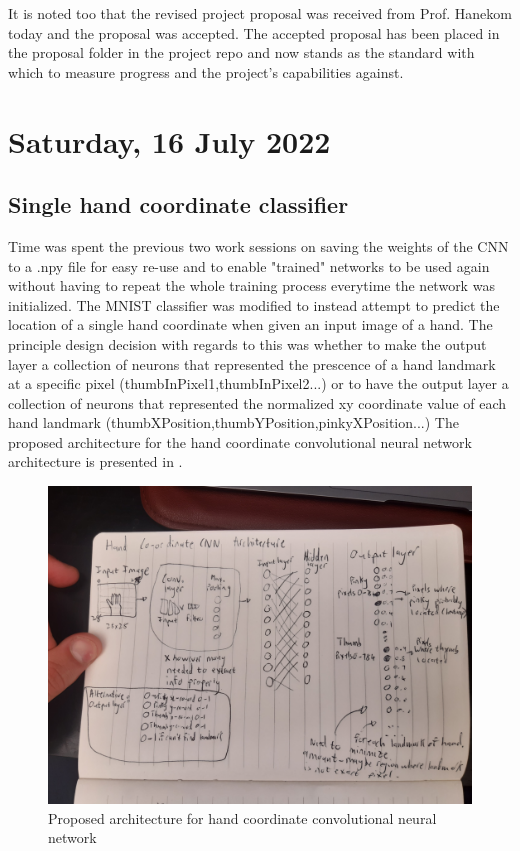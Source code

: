 It is noted too that the revised project proposal was received from Prof. Hanekom today and the proposal was accepted. The accepted proposal has been placed in the proposal folder in the project repo and now stands as the standard with which to measure progress and the project's capabilities against.

\section[2022/07/16]{Saturday, 16 July 2022}

\subsection{Single hand coordinate classifier}

Time was spent the previous two work sessions on saving the weights of the CNN to a .npy file for easy re-use and to enable "trained" networks to be used again without having to repeat the whole training process everytime the network was initialized. The MNIST classifier was modified to instead attempt to predict the location of a single hand coordinate when given an input image of a hand. The principle design decision with regards to this was whether to make the output layer a collection of neurons that represented the prescence of a hand landmark at a specific pixel (thumbInPixel1,thumbInPixel2...) or to have the output layer a collection of neurons that represented the normalized xy coordinate value of each hand landmark (thumbXPosition,thumbYPosition,pinkyXPosition...) The proposed architecture for the hand coordinate convolutional neural network architecture is presented in . \\


\begin{figure}[h]
    \centering
    \includegraphics[width=1.0\linewidth]{figures/hand_conv_arch_labbook.jpg}
    \caption{Proposed architecture for hand coordinate convolutional neural network}
    \label{fig:hand_conv_arch_labbook}
\end{figure}

